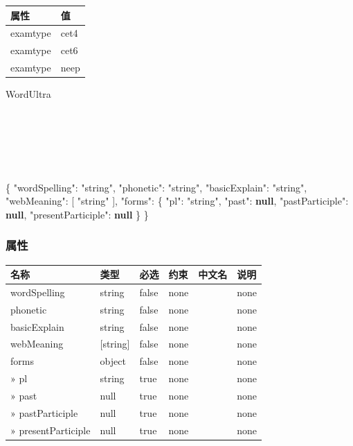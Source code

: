 \documentclass[
]{article}
\newenvironment{Shaded}{}{}
\newcommand{\DataTypeTok}[1]{\textcolor[rgb]{0.56,0.13,0.00}{#1}}
\newcommand{\FunctionTok}[1]{\textcolor[rgb]{0.02,0.16,0.49}{#1}}
\newcommand{\KeywordTok}[1]{\textcolor[rgb]{0.00,0.44,0.13}{\textbf{#1}}}
\newcommand{\OtherTok}[1]{\textcolor[rgb]{0.00,0.44,0.13}{#1}}
\newcommand{\StringTok}[1]{\textcolor[rgb]{0.25,0.44,0.63}{#1}}
\begin{document}
\begin{longtable}[]{@{}ll@{}}
\toprule
属性 & 值 \\
\midrule
\endhead
examtype & cet4 \\
examtype & cet6 \\
examtype & neep \\
\bottomrule
\end{longtable}

WordUltra

\strut \\
\strut \\
\strut \\

\begin{Shaded}
\begin{Highlighting}[]
\FunctionTok{\{}
  \DataTypeTok{"wordSpelling"}\FunctionTok{:} \StringTok{"string"}\FunctionTok{,}
  \DataTypeTok{"phonetic"}\FunctionTok{:} \StringTok{"string"}\FunctionTok{,}
  \DataTypeTok{"basicExplain"}\FunctionTok{:} \StringTok{"string"}\FunctionTok{,}
  \DataTypeTok{"webMeaning"}\FunctionTok{:} \OtherTok{[}
    \StringTok{"string"}
  \OtherTok{]}\FunctionTok{,}
  \DataTypeTok{"forms"}\FunctionTok{:} \FunctionTok{\{}
    \DataTypeTok{"pl"}\FunctionTok{:} \StringTok{"string"}\FunctionTok{,}
    \DataTypeTok{"past"}\FunctionTok{:} \KeywordTok{null}\FunctionTok{,}
    \DataTypeTok{"pastParticiple"}\FunctionTok{:} \KeywordTok{null}\FunctionTok{,}
    \DataTypeTok{"presentParticiple"}\FunctionTok{:} \KeywordTok{null}
  \FunctionTok{\}}
\FunctionTok{\}}
\end{Highlighting}
\end{Shaded}

\hypertarget{ux5c5eux6027-9}{%
\subsubsection{属性}\label{ux5c5eux6027-9}}

\begin{longtable}[]{@{}llllll@{}}
\toprule
名称 & 类型 & 必选 & 约束 & 中文名 & 说明 \\
\midrule
\endhead
wordSpelling & string & false & none & & none \\
phonetic & string & false & none & & none \\
basicExplain & string & false & none & & none \\
webMeaning & {[}string{]} & false & none & & none \\
forms & object & false & none & & none \\
» pl & string & true & none & & none \\
» past & null & true & none & & none \\
» pastParticiple & null & true & none & & none \\
» presentParticiple & null & true & none & & none \\
\bottomrule
\end{longtable}
\end{document}
